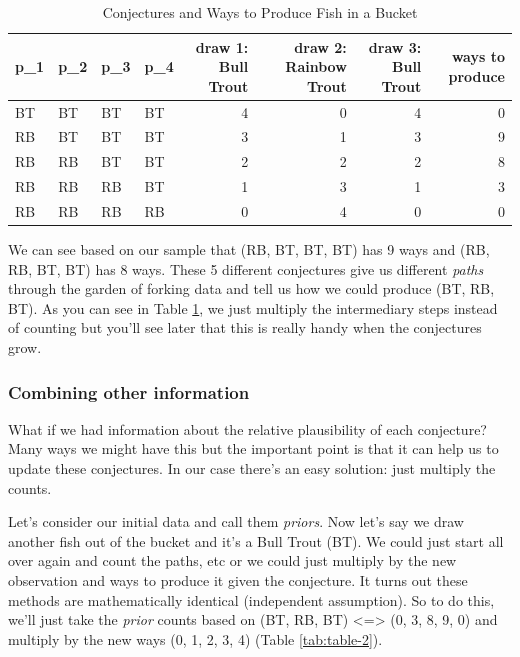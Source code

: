 \documentclass[
]{book}
\begin{document}
\begin{table}

\caption{\label{tab:table-1}Conjectures and Ways to Produce Fish in a Bucket}
\centering
\begin{tabular}[t]{l|l|l|l|r|r|r|r}
\hline
p\_1 & p\_2 & p\_3 & p\_4 & draw 1: Bull Trout & draw 2: Rainbow Trout & draw 3: Bull Trout & ways to produce\\
\hline
BT & BT & BT & BT & 4 & 0 & 4 & 0\\
\hline
RB & BT & BT & BT & 3 & 1 & 3 & 9\\
\hline
RB & RB & BT & BT & 2 & 2 & 2 & 8\\
\hline
RB & RB & RB & BT & 1 & 3 & 1 & 3\\
\hline
RB & RB & RB & RB & 0 & 4 & 0 & 0\\
\hline
\end{tabular}
\end{table}

We can see based on our sample that (RB, BT, BT, BT) has 9 ways and (RB, RB, BT, BT) has 8 ways. These 5 different conjectures give us different \emph{paths} through the garden of forking data and tell us how we could produce (BT, RB, BT). As you can see in Table \ref{tab:table-1}, we just multiply the intermediary steps instead of counting but you'll see later that this is really handy when the conjectures grow.

\hypertarget{combining-other-information}{%
\subsubsection{Combining other information}\label{combining-other-information}}

What if we had information about the relative plausibility of each conjecture? Many ways we might have this but the important point is that it can help us to update these conjectures. In our case there's an easy solution: just multiply the counts.

Let's consider our initial data and call them \emph{priors}. Now let's say we draw another fish out of the bucket and it's a Bull Trout (BT). We could just start all over again and count the paths, etc or we could just multiply by the new observation and ways to produce it given the conjecture. It turns out these methods are mathematically identical (independent assumption). So to do this, we'll just take the \emph{prior} counts based on (BT, RB, BT) \textless=\textgreater{} (0, 3, 8, 9, 0) and multiply by the new ways (0, 1, 2, 3, 4) (Table \ref{tab:table-2}).
\end{document}
